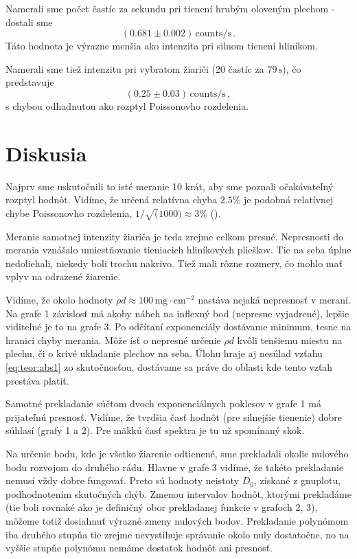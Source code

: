 \documentclass[a4paper, 10pt]{article}
\newcommand{\unit}[1]{\ensuremath{\, \mathrm{#1}}}
\begin{document}
Namerali sme počet častíc za sekundu pri tienení hrubým oloveným plechom - dostali sme 
$$(0.681\pm0.002) \unit{counts/s}\,.$$
Táto hodnota je výrazne menšia ako intenzita pri silnom tienení hliníkom.

Namerali sme tiež intenzitu pri vybratom žiariči ($20$ častíc za $79\unit{s}$), čo predstavuje
$$(0.25\pm0.03) \unit{counts/s}\,,$$
s chybou odhadnutou ako rozptyl Poissonovho rozdelenia.

\section*{Diskusia}
Najprv sme uskutočnili to isté meranie 10 krát, aby sme poznali očakávateľný rozptyl hodnôt. Vidíme, že určená relatívna chyba $2.5\%$ je podobná relatívnej chybe Poissonovho rozdelenia, $1/\sqrt(1000)\approx 3\%$ (\cite{poisson}). 

Meranie samotnej intenzity žiariča je teda zrejme celkom presné. Nepresnosti do merania vznášalo umiestňovanie tieniacich hliníkových plieškov. Tie na seba úplne nedoliehali, niekedy boli trochu nakrivo. Tiež mali rôzne rozmery, čo mohlo mať vplyv na odrazené žiarenie. 

Vidíme, že okolo hodnoty $\rho d \approx 100 \unit{mg\cdot cm^{-2}}$ nastáva nejaká nepresnosť v meraní. Na grafe 1 závislosť má akoby nábeh na inflexný bod (nepresne vyjadrené), lepšie viditeľné je to na grafe 3. Po odčítaní exponenciály dostávame minimum, tesne na hranici chyby merania. Môže ísť o nepresné určenie $\rho d$ kvôli tenšiemu miestu na plechu, či o krivé ukladanie plechov na seba. Úlohu hraje aj nesúlad vzťahu \ref{eq:teor:abs1} zo skutočnosťou, dostávame sa práve do oblasti kde tento vzťah prestáva platiť. 

Samotné prekladanie súčtom dvoch exponenciálnych poklesov v grafe 1 má prijateľnú presnosť. Vidíme, že tvrdšia časť hodnôt (pre silnejšie tienenie) dobre súhlasí (grafy 1 a 2). Pre mäkkú časť spektra je tu už spomínaný skok. 

Na určenie bodu, kde je všetko žiarenie odtienené, sme prekladali okolie nulového bodu rozvojom do druhého rádu. Hlavne v grafe 3 vidíme, že takéto prekladanie nemusí vždy dobre fungovať. Preto sú hodnoty neistoty $D_0$, získané z gnuplotu, podhodnotením skutočných chýb. Zmenou intervalov hodnôt, ktorými prekladáme (tie boli rovnaké ako je definičný obor prekladanej funkcie v grafoch 2, 3), môžeme totiž dosiahnuť výrazné zmeny nulových bodov. Prekladanie polynómom iba druhého stupňa tie zrejme nevystihuje správanie okolo nuly dostatočne, no na vyššie stupňe polynómu nemáme dostatok hodnôt ani presnosť.
\end{document}
